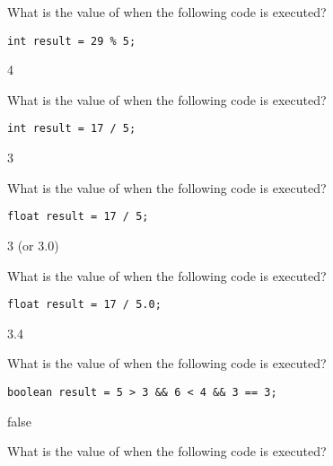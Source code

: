 \begin{questions}
\printanswers

\question What is the value of  when the following code is executed?

\begin{lstlisting}[basicstyle=\large]
	int result = 29 % 5;
\end{lstlisting}

\begin{solution}
4
\end{solution}

\question What is the value of  when the following code is executed?

\begin{lstlisting}[basicstyle=\large]
	int result = 17 / 5;
\end{lstlisting}

\begin{solution}
3
\end{solution}

\question What is the value of  when the following code is executed?

\begin{lstlisting}[basicstyle=\large]
	float result = 17 / 5;
\end{lstlisting}

\begin{solution}
3 (or 3.0)
\end{solution}

\question What is the value of  when the following code is executed?

\begin{lstlisting}[basicstyle=\large]
	float result = 17 / 5.0;
\end{lstlisting}

\begin{solution}
3.4
\end{solution}

\question What is the value of  when the following code is executed?

\begin{lstlisting}[basicstyle=\large]
	boolean result = 5 > 3 && 6 < 4 && 3 == 3;
\end{lstlisting}

\begin{solution}
false
\end{solution}

\question What is the value of  when the following code is executed?


\end{questions}

